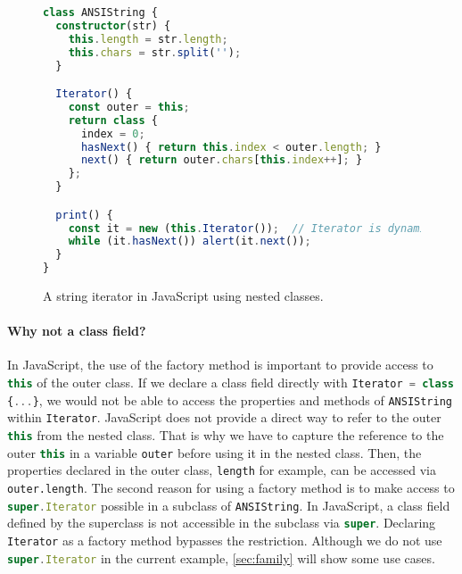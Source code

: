 \begin{figure}
\begin{lstlisting}[language=TypeScript]
class ANSIString {
  constructor(str) {
    this.length = str.length;
    this.chars = str.split('');
  }

  Iterator() {
    const outer = this;
    return class {
      index = 0;
      hasNext() { return this.index < outer.length; }
      next() { return outer.chars[this.index++]; }
    };
  }

  print() {
    const it = new (this.Iterator());  // Iterator is dynamically bound.
    while (it.hasNext()) alert(it.next());
  }
}
\end{lstlisting}
\caption{A string iterator in JavaScript using nested classes.}
\label{fig:string_it}
\end{figure}

\paragraph{Why not a class field?}
In JavaScript, the use of the factory method is important to provide access to
\lstinline[language=TypeScript]{this} of the outer class. If we declare a class
field directly with \lstinline[language=TypeScript]|Iterator = class {...}|, we
would not be able to access the properties and methods of \lstinline{ANSIString}
within \lstinline{Iterator}. JavaScript does not provide a direct way to refer
to the outer \lstinline[language=TypeScript]{this} from the nested class. That
is why we have to capture the reference to the outer
\lstinline[language=TypeScript]{this} in a variable \lstinline{outer} before
using it in the nested class. Then, the properties declared in the outer class,
\lstinline{length} for example, can be accessed via \lstinline{outer.length}.
The second reason for using a factory method is to make access to
\lstinline[language=TypeScript]{super.Iterator} possible in a subclass of
\lstinline{ANSIString}. In JavaScript, a class field defined by the superclass
is not accessible in the subclass via \lstinline[language=TypeScript]{super}.
Declaring \lstinline{Iterator} as a factory method bypasses the restriction.
Although we do not use \lstinline[language=TypeScript]{super.Iterator} in the
current example, \autoref{sec:family} will show some use cases.

